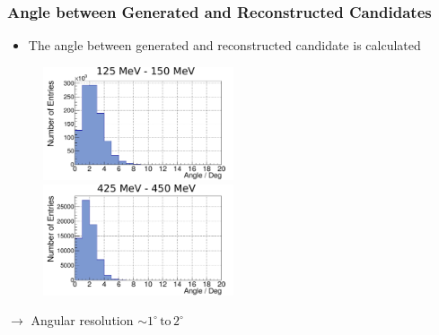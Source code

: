 \documentclass[slidestop,compress,mathserif]{beamer}
\begin{document}
\begin{frame}
	\frametitle{Angle between Generated and Reconstructed Candidates}

\begin{itemize}

	\item The angle between generated and reconstructed candidate is calculated
\end{itemize}

\begin{figure}
	\includegraphics[width=0.5\textwidth]{Pictures/20172604AngleRegGen100-125MeV}
	\includegraphics[width=0.5\textwidth]{Pictures/20172604AngleRegGen400-425MeV}

\end{figure}
$\rightarrow$ Angular resolution $\sim 1^{\circ} \,\text{to}\,2^{\circ}$



\end{frame}
\end{document}
